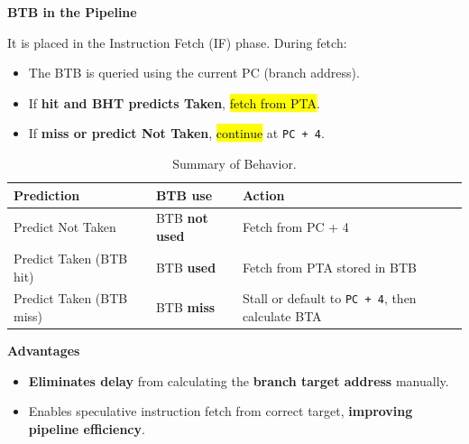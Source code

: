 \highspace
\begin{flushleft}
    \textcolor{Green3}{ \textbf{BTB in the Pipeline}}
\end{flushleft}
It is placed in the Instruction Fetch (IF) phase. During fetch:
\begin{itemize}
    \item The BTB is queried using the current PC (branch address).
    \item If \textbf{hit and BHT predicts Taken}, \hl{fetch from PTA}.
    \item If \textbf{miss or predict Not Taken}, \hl{continue} at \texttt{PC + 4}.
\end{itemize}

\begin{table}[!htp]
    \centering
    \begin{adjustbox}{width={\textwidth},totalheight={\textheight},keepaspectratio}
        \begin{tabular}{@{} l | l | l @{}}
            \toprule
            \textbf{Prediction} & \textbf{BTB use} & \textbf{Action} \\
            \midrule
            Predict Not Taken         & BTB \textbf{not used}  & Fetch from PC + 4                                       \\ [.5em]
            Predict Taken (BTB hit)   & BTB \textbf{used}      & Fetch from PTA stored in BTB                            \\ [.5em]
            Predict Taken (BTB miss)  & BTB \textbf{miss}      & Stall or default to \texttt{PC + 4}, then calculate BTA \\
            \bottomrule
        \end{tabular}
    \end{adjustbox}
    \caption{Summary of Behavior.}
\end{table}

\begin{flushleft}
    \textcolor{Green3}{ \textbf{Advantages}}
\end{flushleft}
\begin{itemize}
    \item[\textcolor{Green3}{\faIcon{check}}] \textbf{Eliminates delay} from calculating the \textbf{branch target address} manually.
    \item[\textcolor{Green3}{\faIcon{check}}] Enables speculative instruction fetch from correct target, \textbf{improving pipeline efficiency}.
\end{itemize}